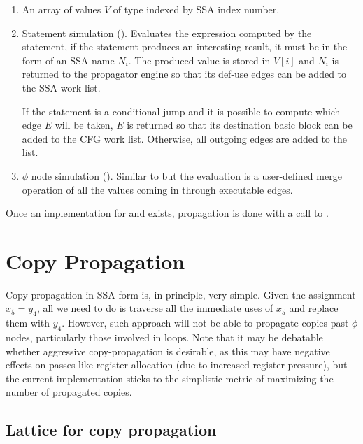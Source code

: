 \begin{enumerate}
\item	An array of values $V$ of type 
	indexed by SSA index number.

\item	Statement simulation ().
	Evaluates the expression computed by the statement, if
	the statement produces an interesting result, it must be
	in the form of an SSA name $N_i$.  The produced value is
	stored in $V[i]$ and $N_i$ is returned to the propagator
	engine so that its def-use edges can be added to the SSA
	work list.

	If the statement is a conditional jump and it is possible
	to compute which edge $E$ will be taken, $E$ is returned
	so that its destination basic block can be added to the
	CFG work list.  Otherwise, all outgoing edges are added
	to the list.

\item	$\phi$ node simulation ().
	Similar to  but the
	evaluation is a user-defined merge operation of all the
	values coming in through executable edges.
\end{enumerate}

Once an implementation for  and
 exists, propagation is done with a
call to .


\section{Copy Propagation}
\label{novillo:sec:copy-prop}

Copy propagation in SSA form is, in principle, very simple.  Given
the assignment $x_5 = y_4$, all we need to do is traverse all the
immediate uses of $x_5$ and replace them with $y_4$.  However,
such approach will not be able to propagate copies past $\phi$
nodes, particularly those involved in loops.  Note that it may be
debatable whether aggressive copy-propagation is desirable, as
this may have negative effects on passes like register allocation
(due to increased register pressure), but the current
implementation sticks to the simplistic metric of maximizing the
number of propagated copies.

\subsection{Lattice for copy propagation}


